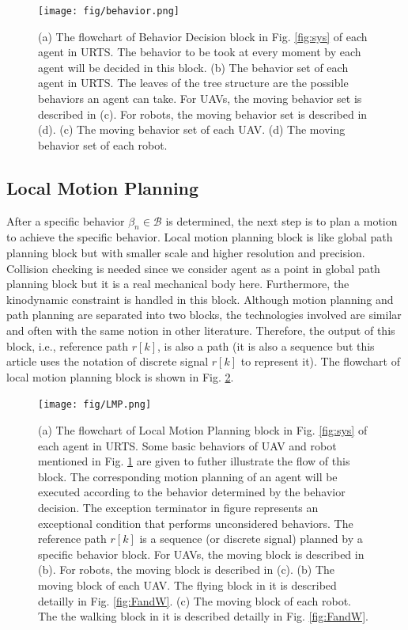\documentclass{ieeeaccess}
\begin{document}
\begin{figure}[htbp]
    \centering
    \texttt{[image: fig/behavior.png]}\caption{
        (a) The flowchart of Behavior Decision block in Fig. \ref{fig:sys} of each agent in URTS. The behavior to be took at every moment by each agent will be decided in this block. 
        (b) The behavior set of each agent in URTS. The leaves of the tree structure are the possible behaviors an agent can take. For UAVs, the moving behavior set is described in (c). For robots, the moving behavior set is described in (d). 
        (c) The moving behavior set of each UAV. 
        (d) The moving behavior set of each robot.}%
    \label{fig:behavior}
\end{figure}

\subsection{Local Motion Planning}
After a specific behavior $\beta_n\in\mathcal{B}$ is determined, the next step is to plan a motion to achieve the specific behavior. Local motion planning block is like global path planning block but with smaller scale and higher resolution and precision. Collision checking is needed since we consider agent as a point in global path planning block but it is a real mechanical body here. Furthermore, the kinodynamic constraint is handled in this block. Although motion planning and path planning are separated into two blocks, the technologies involved are similar and often with the same notion in other literature. Therefore, the output of this block, i.e., reference path $r[k]$, is also a path (it is also a sequence but this article uses the notation of discrete signal $r[k]$ to represent it). The flowchart of local motion planning block is shown in Fig. \ref{fig:LMP}.
\begin{figure}[htbp]
    \centering
    \texttt{[image: fig/LMP.png]}\caption{
        (a) The flowchart of Local Motion Planning block in Fig. \ref{fig:sys} of each agent in URTS. Some basic behaviors of UAV and robot mentioned in Fig. \ref{fig:behavior} are given to futher illustrate the flow of this block. The corresponding motion planning of an agent will be executed according to the behavior determined by the behavior decision. The exception terminator in figure represents an exceptional condition that performs unconsidered behaviors. The reference path $r[k]$ is a sequence (or discrete signal) planned by a specific behavior block. For UAVs, the moving block is described in (b). For robots, the moving block is described in (c). 
        (b) The moving block of each UAV. The flying block in it is described detailly in Fig. \ref{fig:FandW}. 
        (c) The moving block of each robot. The the walking block in it is described detailly in Fig. \ref{fig:FandW}.}
    \label{fig:LMP}
\end{figure}
\end{document}
